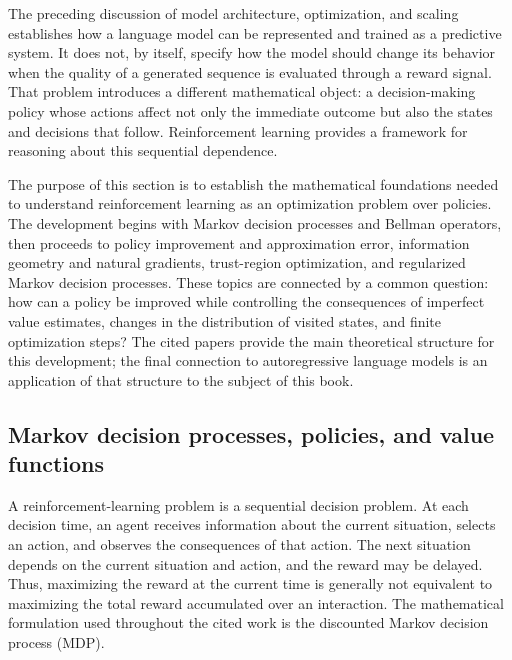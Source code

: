 
The preceding discussion of model architecture, optimization, and scaling
establishes how a language model can be represented and trained as a predictive
system. It does not, by itself, specify how the model should change its behavior
when the quality of a generated sequence is evaluated through a reward signal.
That problem introduces a different mathematical object: a decision-making
policy whose actions affect not only the immediate outcome but also the states
and decisions that follow. Reinforcement learning provides a framework for
reasoning about this sequential dependence.

The purpose of this section is to establish the mathematical foundations needed
to understand reinforcement learning as an optimization problem over policies.
The development begins with Markov decision processes and Bellman operators,
then proceeds to policy improvement and approximation error, information
geometry and natural gradients, trust-region optimization, and regularized
Markov decision processes. These topics are connected by a common question:
how can a policy be improved while controlling the consequences of imperfect
value estimates, changes in the distribution of visited states, and finite
optimization steps? The cited papers provide the main theoretical structure
for this development; the final connection to autoregressive language models
is an application of that structure to the subject of this book.

\subsection{Markov decision processes, policies, and value functions}
\label{subsec:rl-mdp-value-functions}

A reinforcement-learning problem is a sequential decision problem. At each
decision time, an agent receives information about the current situation,
selects an action, and observes the consequences of that action. The next
situation depends on the current situation and action, and the reward may be
delayed. Thus, maximizing the reward at the current time is generally not
equivalent to maximizing the total reward accumulated over an interaction.
The mathematical formulation used throughout the cited work is the discounted
Markov decision process (MDP).

